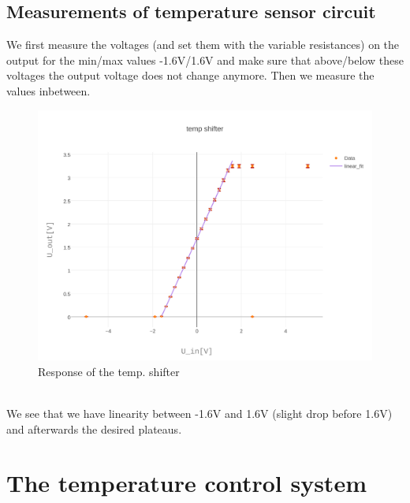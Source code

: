\documentclass[12pt]{scrartcl}
\begin{document}
      \subsection{Measurements of temperature sensor circuit}
        We first measure the voltages (and set them with the variable
        resistances) on the output for the min/max values -1.6V/1.6V and make
        sure that above/below these voltages the output voltage does not change
        anymore. Then we measure the values inbetween.
        \begin{figure}[h]
          \centering
          \includegraphics[width = 0.55
          \textwidth]{./plots/plot_image(3)}
          \caption{Response of the temp. shifter}
          \label{fig9}
        \end{figure}
        \\ We see that we have linearity between -1.6V and 1.6V (slight drop
        before 1.6V) and afterwards the desired plateaus.
    \section{The temperature control system}
\end{document}
